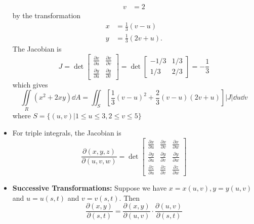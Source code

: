 \begin{itemize}
\begin{example}
\begin{align}
            v &= 2
        \end{align}
        by the transformation 
        \begin{align}
            x &= \frac{1}{3}(v-u) \\ 
            y &= \frac{1}{3}(2v+u).
        \end{align}
        The Jacobian is 
        \begin{equation}
            J = \det \begin{bmatrix}
                \frac{\partial x}{\partial u} & \frac{\partial x}{\partial v} \\ 
                \frac{\partial y}{\partial u} & \frac{\partial y}{\partial v}
            \end{bmatrix} = \det\begin{bmatrix}
                -1/3 & 1/3 \\ 
                1/3 & 2/3
            \end{bmatrix} = -\frac{1}{3}
        \end{equation}
        which gives 
        \begin{equation}
            \iint\limits_R (x^2+2xy)\dd{A} = \iint_S \left[\frac{1}{3}(v-u)^2+\frac{2}{3}(v-u)(2v+u)\right]|J| \dd{u}\dd{v}
        \end{equation}
        where $S=\{(u,v)| 1 \le u \le 3, 2 \le v\le 5\}$
    \end{example}
    \item For triple integrals, the Jacobian is 
    \begin{equation}
        \frac{\partial (x,y,z)}{\partial (u,v,w)} = \det \begin{bmatrix}
            \frac{\partial x}{\partial u} & \frac{\partial x}{\partial v} & \frac{\partial x}{\partial w} \\ 
            \frac{\partial y}{\partial u} & \frac{\partial y}{\partial v} & \frac{\partial y}{\partial w} \\ 
            \frac{\partial z}{\partial u} & \frac{\partial z}{\partial v} & \frac{\partial z}{\partial w}
        \end{bmatrix}
    \end{equation}
    \item \textbf{Successive Transformations:} Suppose we have $x=x(u,v), y=y(u,v)$ and $u=u(s,t)$ and $v=v(s,t).$ Then
    \begin{equation}
        \frac{\partial(x,y)}{\partial(s,t)} = \frac{\partial(x,y)}{\partial(u,v)}\cdot \frac{\partial (u,v)}{\partial (s,t)}

\end{equation}
\end{itemize}
